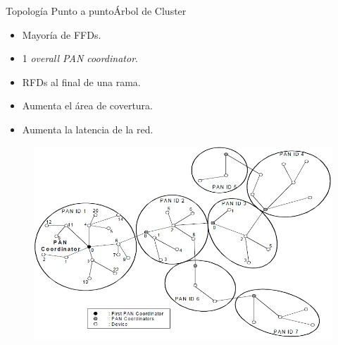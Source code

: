 \documentclass[aspectratio=169]{beamer}
\begin{document}
\begin{frame}{Topología Punto a punto}{Árbol de Cluster}
\begin{minipage}[c]{1.0\linewidth}
\begin{minipage}[c]{0.4\linewidth}
		\begin{itemize}
			\item Mayoría de FFDs.
			\vspace{5px}
			\item 1 \textit{overall PAN coordinator}.
			\vspace{5px}
			\item RFDs al final de una rama.
			\vspace{5px}
			\item Aumenta el área de covertura.
			\vspace{5px}
			\item Aumenta la latencia de la red.
		\end{itemize}	
	\end{minipage}
	\hspace{-15px}
	\begin{minipage}[c]{0.65\linewidth}
		\begin{figure}[H]
			{\includegraphics[width=.8\textwidth]{./imagenes/cluster}}
		\end{figure}	  	  	
	\end{minipage}
\end{minipage}
\end{frame}
\end{document}
